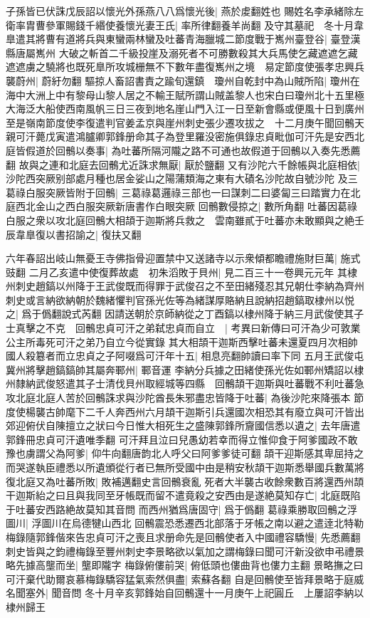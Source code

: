 子孫皆已伏誅戊辰詔以懷光外孫燕八八爲懷光後|{
	燕於䖍翻姓也}
賜姓名李承緒除左衛率胄曹參軍賜錢千緡使養懷光妻王氏|{
	率所律翻養羊尚翻}
及守其墓祀　冬十月韋臯遣其將曹有道將兵與東蠻兩林蠻及吐蕃青海臘城二節度戰于嶲州臺登谷|{
	臺登漢縣唐屬嶲州}
大破之斬首二千級投崖及溺死者不可勝數殺其大兵馬使乞藏遮遮乞藏遮遮虜之驍將也既死臯所攻城栅無不下數年盡復嶲州之境　易定節度使張孝忠興兵襲蔚州|{
	蔚紆勿翻}
驅掠人畜詔書責之踰旬還鎮　瓊州自乾封中為山賊所陷|{
	瓊州在海中大洲上中有黎母山黎人居之不輸王賦所謂山賊盖黎人也宋白曰瓊州北十五里極大海泛大船使西南風帆三日三夜到地名崖山門入江一日至新會縣或便風十日到廣州}
至是嶺南節度使李復遣判官姜孟京與崖州刺史張少遷攻拔之　十二月庚午聞回鶻天親可汗薨戊寅遣鴻臚卿郭鋒册命其子為登里羅没密施俱錄忠貞毗伽可汗先是安西北庭皆假道於回鶻以奏事|{
	為吐蕃所隔河隴之路不可通也故假道于回鶻以入奏先悉薦翻}
故與之連和北庭去回鶻尤近誅求無厭|{
	厭於鹽翻}
又有沙陀六千餘帳與北庭相依|{
	沙陀西突厥别部處月種也居金娑山之陽蒲類海之東有大磧名沙陀故自號沙陀}
及三葛祿白服突厥皆附于回鶻|{
	三葛祿葛邏祿三部也一曰謀刺二曰婆匐三曰踏實力在北庭西北金山之西白服突厥新唐書作白眼突厥}
回鶻數侵掠之|{
	數所角翻}
吐蕃因葛祿白服之衆以攻北庭回鶻大相頡于迦斯將兵救之　雲南雖貳于吐蕃亦未敢顯與之絶壬辰韋臯復以書招諭之|{
	復扶又翻}


六年春詔出岐山無憂王寺佛指骨迎置禁中又送諸寺以示衆傾都瞻禮施財巨萬|{
	施式豉翻}
二月乙亥遣中使復葬故處　初朱滔敗于貝州|{
	見二百三十一卷興元元年}
其棣州刺史趙鎬以州降于王武俊既而得罪于武俊召之不至田緒殘忍其兄朝仕李納為齊州刺史或言納欲納朝於魏緒懼判官孫光佐等為緒謀厚賂納且說納招趙鎬取棣州以悦之|{
	爲于僞翻說式芮翻}
因請送朝於京師納從之丁酉鎬以棣州降于納三月武俊使其子士真擊之不克　回鶻忠貞可汗之弟弑忠貞而自立　|{
	考異曰新傳曰可汗為少可敦業公主所毒死可汗之弟乃自立今從實錄}
其大相頡干迦斯西擊吐蕃未還夏四月次相帥國人殺簒者而立忠貞之子阿啜爲可汗年十五|{
	相息亮翻帥讀曰率下同}
五月王武俊屯冀州將擊趙鎬鎬帥其屬奔鄆州|{
	鄆音運}
李納分兵據之田緒使孫光佐如鄆州矯詔以棣州隸納武俊怒遣其子士清伐貝州取經城等四縣　回鶻頡干迦斯與吐蕃戰不利吐蕃急攻北庭北庭人苦於回鶻誅求與沙陀酋長朱邪盡忠皆降于吐蕃|{
	為後沙陀來降張本}
節度使楊襲古帥麾下二千人奔西州六月頡干迦斯引兵還國次相恐其有廢立與可汗皆出郊迎俯伏自陳擅立之狀曰今日惟大相死生之盛陳郭鋒所齎國信悉以遺之|{
	去年唐遣郭鋒冊忠貞可汗遺唯季翻}
可汗拜且泣曰兒愚幼若幸而得立惟仰食于阿爹國政不敢豫也虜謂父為阿爹|{
	仰牛向翻唐韵北人呼父曰阿爹爹徒可翻}
頡干迎斯感其卑屈持之而哭遂執臣禮悉以所遺頒從行者已無所受國中由是稍安秋頡干迦斯悉舉國兵數萬將復北庭又為吐蕃所敗|{
	敗補邁翻史言回鶻衰亂}
死者大半襲古收餘衆數百將還西州頡干迦斯紿之曰且與我同至牙帳既而留不遣竟殺之安西由是遂絶莫知存亡|{
	北庭既陷于吐蕃安西路絶故莫知其音問}
而西州猶爲唐固守|{
	爲于僞翻}
葛祿乘勝取回鶻之浮圖川|{
	浮圖川在烏德犍山西北}
回鶻震恐悉遷西北部落于牙帳之南以避之遣逹北特勒梅錄隨郭鋒偕來告忠貞可汗之喪且求册命先是回鶻使者入中國禮容驕慢|{
	先悉薦翻}
刺史皆與之鈞禮梅錄至豐州刺史李景略欲以氣加之謂梅錄曰聞可汗新没欲申弔禮景略先據高壟而坐|{
	壟即隴字}
梅錄俯僂前哭|{
	俯低頭也僂曲背也僂力主翻}
景略撫之曰可汗棄代助爾哀慕梅錄驕容猛氣索然俱盡|{
	索蘇各翻}
自是回鶻使至皆拜景略于庭威名聞塞外|{
	聞音問}
冬十月辛亥郭鋒始自回鶻還十一月庚午上祀圓丘　上屢詔李納以棣州歸王

